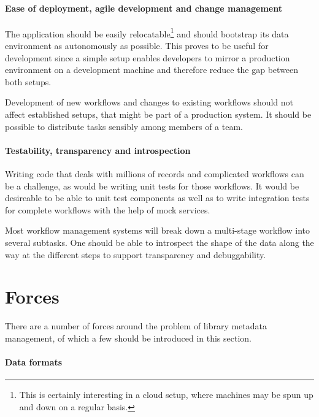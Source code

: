 \documentclass[english]{lni}
\begin{document}

\paragraph{Ease of deployment, agile development and change management} The application
    should be easily relocatable\footnote{This is certainly interesting in a cloud setup,
    where machines may be spun up and down on a regular basis.}
    and should bootstrap its
    data environment as autonomously as possible. This proves to be useful
    for development since a simple setup enables developers to
    mirror a production environment on a development machine and therefore
    reduce the gap between both setups.

    Development of new workflows
    and changes to existing workflows should not affect established setups, that
    might be part of a production system. It should be possible to distribute
    tasks sensibly among members of a team.

\paragraph{Testability, transparency and introspection}
Writing code that deals with millions of records and complicated workflows
can be a challenge, as would be writing unit tests for those workflows. It would
be desireable to be able to unit test components as well as to write integration
tests for complete workflows with the help of mock services.

Most workflow
    management systems will break down a multi-stage workflow into
    several subtasks. One should be able to introspect the shape of the
    data along the way at the different steps to support transparency and debuggability.

\section{Forces}
\label{forces}

There are a number of forces around the problem of library metadata management,
of which a few should be introduced in this section.

    \paragraph{Data formats}
\end{document}
